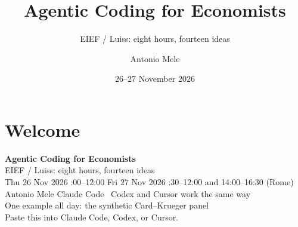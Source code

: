 


\title{Agentic Coding for Economists}
\subtitle{EIEF / Luiss: eight hours, fourteen ideas}
\author{Antonio Mele}
\date{26--27 November 2026}

\newcommand{\inplainwords}[1]{%
  \begin{block}{In plain words}\large #1\end{block}}
\newcommand{\likethis}[1]{%
  \vspace{0.8em}{\large \textcolor{courseteal}{\textbf{Think of it as:}} #1}}
\newcommand{\youtry}[1]{\textcolor{coursegray}{\small\textsf{Your turn \textperiodcentered\ #1}}}



\section{Welcome}

\begin{frame}{}
  \begin{center}
    {\LARGE \textbf{Agentic Coding for Economists}}\\[0.12em]
    {\large EIEF / Luiss: eight hours, fourteen ideas}\\[0.25em]
    {\small Thu 26 Nov 2026 :00--12:00 \quad\textperiodcentered\quad
      Fri 27 Nov 2026 :30--12:00 and 14:00--16:30 (Rome)}\\[0.18em]
    {\small Antonio Mele \quad\textperiodcentered\quad
      Claude Code \textperiodcentered\ Codex and Cursor work the same way}\\[0.1em]
    {\small One example all day: the synthetic Card--Krueger panel}\\[0.35em]
    {\footnotesize Paste this into Claude Code, Codex, or Cursor.}
  \end{center}
  \vspace{0.25em}
  \begin{center}
  \end{center}
\end{frame}

